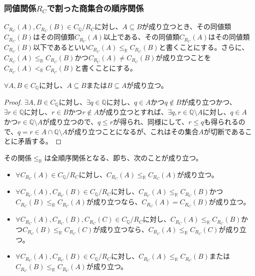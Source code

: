 \documentclass[dvipdfmx]{jsarticle}
\begin{document}
\subsubsection{同値関係$R_{C}$で割った商集合の順序関係}%
\begin{dfn}
$C_{R_{C}}(A),C_{R_{C}}(B) \in C_{\mathbb{Q}} /R_{C} $に対し、$A \subseteq B$が成り立つとき、その同値類$C_{R_{C}}(B)$はその同値類$C_{R_{C}}(A)$以上である、その同値類$C_{R_{C}}(A)$はその同値類$C_{R_{C}}(B)$以下であるといい$C_{R_{C}}(A) \leq_{\mathbb{R}}C_{R_{C}}(B)$と書くことにする。さらに、$C_{R_{C}}(A) \leq_{\mathbb{R}}C_{R_{C}}(B)$かつ$C_{R_{C}}(A) \neq C_{R_{C}}(B)$が成り立つことを$C_{R_{C}}(A) <_{\mathbb{R}}C_{R_{C}}(B)$と書くことにする。
\end{dfn}
\begin{thm}\label{1.2.6.34}
$\forall A,B \in C_{\mathbb{Q}}$に対し、$A \subseteq B$または$B \subseteq A$が成り立つ。
\end{thm}
\begin{proof}
$\exists A,B \in C_{\mathbb{Q}}$に対し、$\exists q \in \mathbb{Q}$に対し、$q \in A$かつ$q \notin B$が成り立つかつ、$\exists r \in \mathbb{Q}$に対し、$r \in B$かつ$r \notin A$が成り立つとすれば、$\exists q,r \in \mathbb{Q} \setminus A$に対し、$q \in A$かつ$r \in \mathbb{Q} \setminus A$が成り立つので、$q \leq r$が得られ、同様にして、$r \leq q$も得られるので、$q = r \in A \cap \mathbb{Q} \setminus A$が成り立つことになるが、これはその集合$A$が切断であることに矛盾する。
\end{proof}
\begin{thm}\label{1.2.6.35}
その関係$\leq_{\mathbb{R}}$は全順序関係となる、即ち、次のことが成り立つ。
\begin{itemize}
\item
  $\forall C_{R_{C}}(A) \in C_{\mathbb{Q}} /R_{C} $に対し、$C_{R_{C}}(A) \leq_{\mathbb{R}}C_{R_{C}}(A)$が成り立つ。
\item
  $\forall C_{R_{C}}(A),C_{R_{C}}(B) \in C_{\mathbb{Q}} /R_{C} $に対し、$C_{R_{C}}(A) \leq_{\mathbb{R}}C_{R_{C}}(B)$かつ$C_{R_{C}}(B) \leq_{\mathbb{R}}C_{R_{C}}(A)$が成り立つなら、$C_{R_{C}}(A) = C_{R_{C}}(B)$が成り立つ。
\item
  $\forall C_{R_{C}}(A),C_{R_{C}}(B),C_{R_{C}}(C) \in C_{\mathbb{Q}} /R_{C} $に対し、$C_{R_{C}}(A) \leq_{\mathbb{R}}C_{R_{C}}(B)$かつ$C_{R_{C}}(B) \leq_{\mathbb{R}}C_{R_{C}}(C)$が成り立つなら、$C_{R_{C}}(A) \leq_{\mathbb{R}}C_{R_{C}}(C)$が成り立つ。
\item
  $\forall C_{R_{C}}(A),C_{R_{C}}(B) \in C_{\mathbb{Q}} /R_{C} $に対し、$C_{R_{C}}(A) \leq_{\mathbb{R}}C_{R_{C}}(B)$または$C_{R_{C}}(B) \leq_{\mathbb{R}}C_{R_{C}}(A)$が成り立つ。
\end{itemize}
\end{thm}
\end{document}

